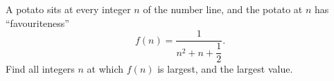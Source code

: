 A potato sits at every integer $n$ of the number line, and the potato at $n$ has ``favouriteness''
\[
f(n)=\dfrac{1}{n^2+n+\dfrac{1}{2}} .
\]
Find all integers $n$ at which $f(n)$ is largest, and the largest value.
